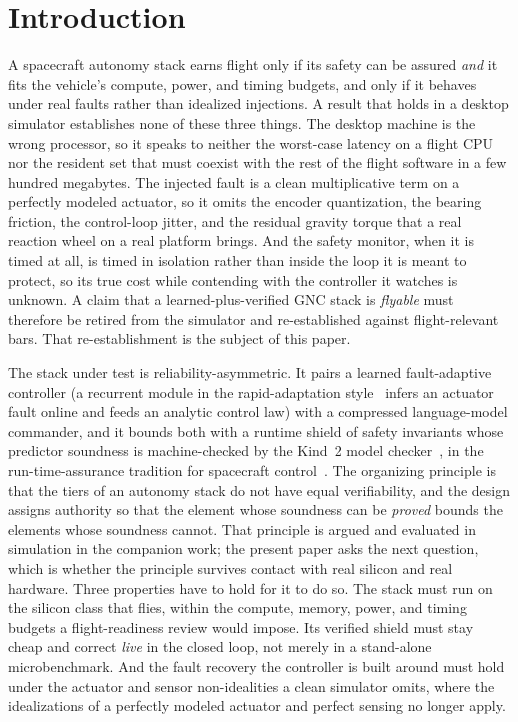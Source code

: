 \documentclass[11pt]{article}
\begin{document}
\section{Introduction}
A spacecraft autonomy stack earns flight only if its safety can be assured \emph{and} it fits
the vehicle's compute, power, and timing budgets, and only if it behaves under real faults
rather than idealized injections. A result that holds in a desktop simulator establishes none
of these three things. The desktop machine is the wrong processor, so it speaks to neither the
worst-case latency on a flight CPU nor the resident set that must coexist with the rest of the
flight software in a few hundred megabytes. The injected fault is a clean multiplicative term on
a perfectly modeled actuator, so it omits the encoder quantization, the bearing friction, the
control-loop jitter, and the residual gravity torque that a real reaction wheel on a real
platform brings. And the safety monitor, when it is timed at all, is timed in isolation rather
than inside the loop it is meant to protect, so its true cost while contending with the
controller it watches is unknown. A claim that a learned-plus-verified GNC stack is
\emph{flyable} must therefore be retired from the simulator and re-established against
flight-relevant bars. That re-establishment is the subject of this paper.

The stack under test is reliability-asymmetric. It pairs a learned fault-adaptive controller (a
recurrent module in the rapid-adaptation style~\cite{Kumar2021} infers an actuator fault online
and feeds an analytic control law) with a compressed language-model commander, and it bounds
both with a runtime shield of safety invariants whose predictor soundness is machine-checked by
the Kind~2 model checker~\cite{Champion2016}, in the run-time-assurance tradition for spacecraft
control~\cite{Dunlap2023}. The organizing principle is that the tiers of an autonomy stack do
not have equal verifiability, and the design assigns authority so that the element whose
soundness can be \emph{proved} bounds the elements whose soundness cannot. That principle is
argued and evaluated in simulation in the companion work; the present paper asks the next
question, which is whether the principle survives contact with real silicon and real hardware.
Three properties have to hold for it to do so. The stack must run on the silicon class that
flies, within the compute, memory, power, and timing budgets a flight-readiness review would
impose. Its verified shield must stay cheap and correct \emph{live} in the closed loop, not
merely in a stand-alone microbenchmark. And the fault recovery the controller is built around
must hold under the actuator and sensor non-idealities a clean simulator omits, where the
idealizations of a perfectly modeled actuator and perfect sensing no longer apply.
\end{document}
